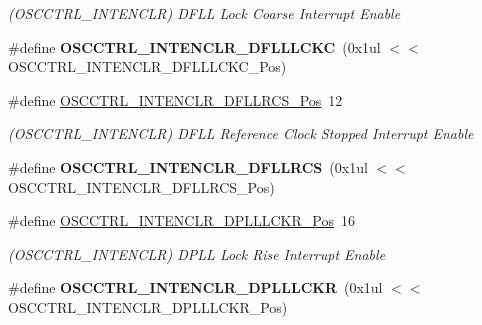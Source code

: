\begin{DoxyCompactItemize}
\begin{DoxyCompactList}\small\item\em (O\+S\+C\+C\+T\+R\+L\+\_\+\+I\+N\+T\+E\+N\+C\+L\+R) D\+F\+L\+L Lock Coarse Interrupt Enable \end{DoxyCompactList}\item 
\hypertarget{group___s_a_m_l21___o_s_c_c_t_r_l_gada53bcece189f8ae3830fd19860e7d29}{}\#define {\bfseries O\+S\+C\+C\+T\+R\+L\+\_\+\+I\+N\+T\+E\+N\+C\+L\+R\+\_\+\+D\+F\+L\+L\+L\+C\+K\+C}~(0x1ul $<$$<$ O\+S\+C\+C\+T\+R\+L\+\_\+\+I\+N\+T\+E\+N\+C\+L\+R\+\_\+\+D\+F\+L\+L\+L\+C\+K\+C\+\_\+\+Pos)\label{group___s_a_m_l21___o_s_c_c_t_r_l_gada53bcece189f8ae3830fd19860e7d29}

\item 
\hypertarget{group___s_a_m_l21___o_s_c_c_t_r_l_ga6777b5190c055d4589c685a6672fe9f4}{}\#define \hyperlink{group___s_a_m_l21___o_s_c_c_t_r_l_ga6777b5190c055d4589c685a6672fe9f4}{O\+S\+C\+C\+T\+R\+L\+\_\+\+I\+N\+T\+E\+N\+C\+L\+R\+\_\+\+D\+F\+L\+L\+R\+C\+S\+\_\+\+Pos}~12\label{group___s_a_m_l21___o_s_c_c_t_r_l_ga6777b5190c055d4589c685a6672fe9f4}

\begin{DoxyCompactList}\small\item\em (O\+S\+C\+C\+T\+R\+L\+\_\+\+I\+N\+T\+E\+N\+C\+L\+R) D\+F\+L\+L Reference Clock Stopped Interrupt Enable \end{DoxyCompactList}\item 
\hypertarget{group___s_a_m_l21___o_s_c_c_t_r_l_ga5927c80dc5b35364e73dbc76df8a7da0}{}\#define {\bfseries O\+S\+C\+C\+T\+R\+L\+\_\+\+I\+N\+T\+E\+N\+C\+L\+R\+\_\+\+D\+F\+L\+L\+R\+C\+S}~(0x1ul $<$$<$ O\+S\+C\+C\+T\+R\+L\+\_\+\+I\+N\+T\+E\+N\+C\+L\+R\+\_\+\+D\+F\+L\+L\+R\+C\+S\+\_\+\+Pos)\label{group___s_a_m_l21___o_s_c_c_t_r_l_ga5927c80dc5b35364e73dbc76df8a7da0}

\item 
\hypertarget{group___s_a_m_l21___o_s_c_c_t_r_l_ga215141999ca7ddf3e70b4557810afd0c}{}\#define \hyperlink{group___s_a_m_l21___o_s_c_c_t_r_l_ga215141999ca7ddf3e70b4557810afd0c}{O\+S\+C\+C\+T\+R\+L\+\_\+\+I\+N\+T\+E\+N\+C\+L\+R\+\_\+\+D\+P\+L\+L\+L\+C\+K\+R\+\_\+\+Pos}~16\label{group___s_a_m_l21___o_s_c_c_t_r_l_ga215141999ca7ddf3e70b4557810afd0c}

\begin{DoxyCompactList}\small\item\em (O\+S\+C\+C\+T\+R\+L\+\_\+\+I\+N\+T\+E\+N\+C\+L\+R) D\+P\+L\+L Lock Rise Interrupt Enable \end{DoxyCompactList}\item 
\hypertarget{group___s_a_m_l21___o_s_c_c_t_r_l_gaad6e80b6324e612a84ce1c9209c1ef62}{}\#define {\bfseries O\+S\+C\+C\+T\+R\+L\+\_\+\+I\+N\+T\+E\+N\+C\+L\+R\+\_\+\+D\+P\+L\+L\+L\+C\+K\+R}~(0x1ul $<$$<$ O\+S\+C\+C\+T\+R\+L\+\_\+\+I\+N\+T\+E\+N\+C\+L\+R\+\_\+\+D\+P\+L\+L\+L\+C\+K\+R\+\_\+\+Pos)\label{group___s_a_m_l21___o_s_c_c_t_r_l_gaad6e80b6324e612a84ce1c9209c1ef62}


\end{DoxyCompactItemize}
